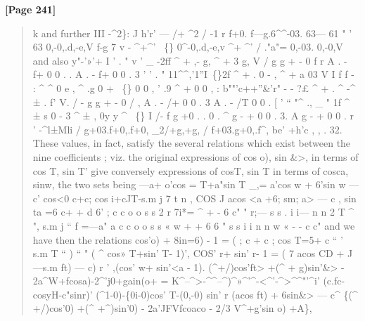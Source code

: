 \documentclass[11pt,a4paper]{book}
\begin{document}
\textbf{[Page 241]}\\[0.2cm]
\begin{quote}
k
and further
III -\textasciicircum{}2\}: J h'r' --- /+ \textasciicircum{}2 /
-1 r
f+0.
f---g.6\textasciicircum{}\textasciicircum{}-03. 63--- 61 " ' 63
0,-0,.d,-e,V f-g
7
v - \textasciicircum{}+\textasciicircum{}'
~\{\}
0\textasciicircum{}-0,.d,-e,v
\textasciicircum{}+ \textasciicircum{}' /
."a"=
0,-03. 0,-0,V
and also
y"-'»'+ I ' . " v ' \_ -2ff \textasciicircum{} + ,- g, \textasciicircum{} + 3 g, V / g g + - 0 f r A . - f+ 0 0 . . A . - f+ 0 0 . 3 ' ' . " 11\textasciicircum{}\textasciicircum{},'1''I~\{\}2f \textasciicircum{} + . 0 - , \textasciicircum{} + a 03 V I f f - : \textasciicircum{} \textasciicircum{} 0 e , \textasciicircum{} .g 0 + ~\{\} 0 0 , ' .9 \textasciicircum{} + 0 0  , :
b""'c++''\&'r" - - ?£ \textasciicircum{} + . \textasciicircum{} -\textasciicircum{} ± . f' V. / - g g + - 0 / , A . - /+ 0 0 . 3 A . - /T 0 0 . [ ' `` "\textasciicircum{} ., \_ " 1f \textasciicircum{} ± s 0 - 3 \textasciicircum{} ± , 0y y \textasciicircum{} ~\{\} I /- f g +0 . . 0 . \textasciicircum{} g - + 0 0 . 3. A g - + 0 0 . r '
-\textasciicircum{}l±Mli / g+03.f+0,.f+0, \_2/+g,+g, / f+03.g+0,.f\textasciicircum{},
be' +h'c , , .
32. These values, in fact, satisfy the several relations which exist between the
nine coefficients ; viz. the original expressions of cos o), sin \&>, in terms of cos T, sin T'
give conversely expressions of cosT, sin T in terms of cosca, sinw, the two sets being
---a+ o'cos = T+a"sin T \_,= a'cos w + 6'sin w --- c'
cos<0 c+c; cos i+cJT-s.m j 7 t n , COS J acos <a +6; sm; a> --- c ,
sin ta =6 c+ + d 6' ; c c o o s s 2 r 7i*= \textasciicircum{} + - 6 c" " r;--- s s . i i--- n n 2 T \textasciicircum{} ", s.m j `` f =---a" a c c o o s s « w + + 6 6 " s s i i n n w « - - c c"
and we have then the relations
cos'o) + 8in=6) - 1 = ( ; c + c ; cos T=5+ c `` ' s.m T `` ) `` " ( \textasciicircum{} cos» T+sin' T- 1)',
COS'
r+
sin'
r-
1
=
( 7 acos CD + J---s.m ft) --- c) r ' ,(cos'
w+
sin'<a
-
1).
(\textasciicircum{}+/)cos'ft> +(\textasciicircum{} + g)sin'\&> - 2a\textasciicircum{}W+fcosa)-2\textasciicircum{}'j0+gain(o+
= K\textasciicircum{}--\textasciicircum{}>-\textasciicircum{}\textasciicircum{}--\textasciicircum{})\textasciicircum{}»\textasciicircum{}'\textasciicircum{}-<\textasciicircum{}'-\textasciicircum{}>\textasciicircum{}\textasciicircum{}"'\textasciicircum{}i'
(c.fc-cosyH-c"sinr)'
(\textasciicircum{}1-0)-\{0i-0)cos' T-(0,-0) sin' r
(acos ft) + 6sin\&> --- c\textasciicircum{} \{(\textasciicircum{} +/)cos'0) +(\textasciicircum{} +\textasciicircum{})sin'0) - 2a'JFVfcoaco - 2/3 V\textasciicircum{}+g'sin o) +A\},
\end{quote}
\end{document}
